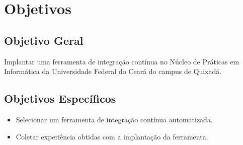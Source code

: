 \chapter{Objetivos}\label{objetivos}
\section{Objetivo Geral}\label{objetivoger}
Implantar uma ferramenta de integração contínua no Núcleo de Práticas em Informática da Universidade Federal do Ceará do campus de Quixadá.

\section{Objetivos Específicos}

\begin{itemize}
\item Selecionar um ferramenta de integração contínua automatizada.
\item Coletar experiência obtidas com a implantação da ferramenta.
\end{itemize}